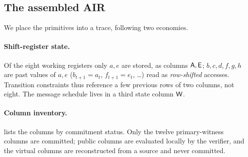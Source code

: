 \subsection{The assembled AIR}
\label{sec:air}

We place the primitives into a trace, following two economies.

\paragraph{Shift-register state.} Of the eight working registers only $a,e$ are
stored, as columns $\mathsf{A},\mathsf{E}$; $b,c,d,f,g,h$ are past values of $a,e$
($b_{t+1}=a_t$, $f_{t+1}=e_t$, \dots) read as \emph{row-shifted} accesses.
Transition constraints thus reference a few previous rows of two columns, not
eight. The message schedule lives in a third state column $\mathsf{W}$.

\paragraph{Column inventory.}  lists the columns by commitment
status. Only the twelve primary-witness columns are committed; public columns
are evaluated locally by the verifier, and the virtual columns are reconstructed
from a source and never committed.


